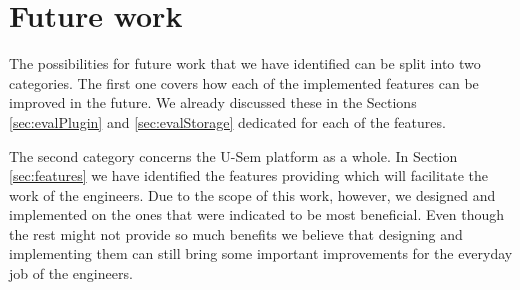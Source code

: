 \section{Future work}
\label{sec:concFuture}

The possibilities for future work that we have identified can be split into two categories. The first one covers how each of the implemented features can be improved in the future. We already discussed these in the Sections \ref{sec:evalPlugin} and \ref{sec:evalStorage} dedicated for each of the features. 

The second category concerns the U-Sem platform as a whole. In Section \ref{sec:features} we have identified the features providing which will facilitate the work of the engineers. Due to the scope of this work, however, we designed and implemented on the ones that were indicated to be most beneficial. Even though the rest might not provide so much benefits we believe that designing and implementing them can still bring some important improvements for the everyday job of the engineers.
